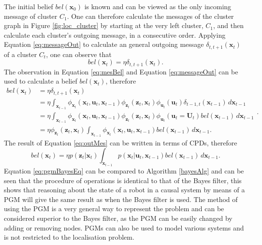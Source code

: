 \documentclass[12pt,oneside,openany,a4paper, %
afrikaans,english,
]{memoir}
\numberwithin{equation}{chapter}
\begin{document}
The initial belief $bel(\bm{x}_0)$ is known and can be viewed as the only incoming message of cluster $C_1$. One can therefore calculate the messages of the cluster graph in Figure \ref{fig:loc_cluster} by starting at the very left cluster, $C_1$, and then calculate each cluster's outgoing message, in a consecutive order.
Applying Equation \ref{eq:messageOut} to calculate an general outgoing message $\delta_{t,t+1}(\bm{x}_t)$ of a cluster $C_t$, one can observe that
\begin{equation}\label{eq:mesBel}
bel(\bm{x}_t) = \eta\delta_{t,t+1}(\bm{x}_t).
\end{equation}
The observation in Equation \ref{eq:mesBel} and Equation \ref{eq:messageOut} can be used to calculate a belief $bel(\bm{x}_t)$, therefore
\begin{equation}\label{eq:outMes}
\begin{split}
bel(\bm{x}_t) & = \eta \delta_{t,t+1}(\bm{x}_t)\\
& = \eta \int_{\bm{x}_{t-1}}\phi_{\bm{x}_t}(\bm{x}_t,\bm{u}_t,\bm{x}_{t-1})\phi_{\bm{z}_t}(\bm{z}_t,\bm{x}_t)\phi_{\bm{u}_t}(\bm{u}_t)\delta_{t-1,t}(\bm{x}_{t-1})\,d\bm{x}_{t-1}\\
& = \eta \int_{\bm{x}_{t-1}}\phi_{\bm{x}_t}(\bm{x}_t,\bm{u}_t,\bm{x}_{t-1})\phi_{\bm{z}_t}(\bm{z}_t,\bm{x}_t)\phi_{\bm{u}_t}(\bm{u}_t =\bm{U}_t)bel(\bm{x}_{t-1})\,d\bm{x}_{t-1}\\
& = \eta \phi_{\bm{z}_t}(\bm{z}_t,\bm{x}_t)\int_{\bm{x}_{t-1}}\phi_{\bm{x}_t}(\bm{x}_t,\bm{u}_t,\bm{x}_{t-1})bel(\bm{x}_{t-1})\,d\bm{x}_{t-1}.
\end{split}.
\end{equation}
The result of Equation \ref{eq:outMes} can be written in terms of CPDs, therefore
\begin{equation}\label{eq:pgmBayesEq}
bel(\bm{x}_t) = \eta p(\bm{z}_t|\bm{x}_t)\int_{\bm{x}_{t-1}}p(\bm{x}_t|\bm{u}_t,\bm{x}_{t-1})bel(\bm{x}_{t-1})\,d\bm{x}_{t-1}.
\end{equation}
Equation \ref{eq:pgmBayesEq} can be compared to Algorithm \ref{bayesAlg} and can be seen that the procedure of operations is identical to that of the Bayes filter, this shows that reasoning about the state of a robot in a causal system by means of a PGM will give the same result as when the Bayes filter is used. The method of using the PGM is a very general way to represent the problem and can be considered superior to the Bayes filter, as the PGM can be easily changed by adding or removing nodes. PGMs can also be used to model various systems and is not restricted to the localisation problem.
\end{document}
